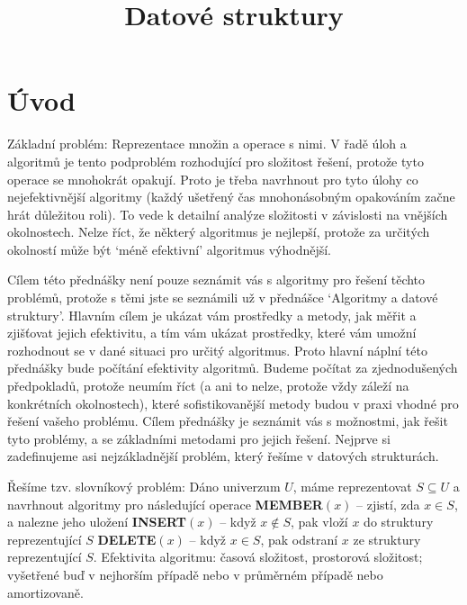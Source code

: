 \documentclass[a4paper,12pt]{article}
\begin{document}
     

\newtheorem*{dusledek}{Důsledek}
\newtheorem*{lemma}{Lemma}
\newtheorem*{veta}{Věta}
\newtheorem*{tvrzeni}{Tvrzení}

\def \emph#1{\underbar{#1}}
\def \Prob{\operatorname{Prob}}
\def \var{\operatorname{var}}

\title{Datové struktury}
\date{}
\maketitle

\section{Úvod}

Základní problém: Reprezentace množin a 
operace s nimi. V řadě úloh a algoritmů je tento 
podproblém rozhodující pro složitost řešení, protože 
tyto operace se mnohokrát opakují. Proto je třeba 
navrhnout pro tyto úlohy co nejefektivnější algoritmy 
(každý ušetřený čas mnohonásobným opakováním začne 
hrát důležitou roli). To vede k detailní 
analýze složitosti v závislosti na vnějších okolnostech. 
Nelze říct, 
že některý algoritmus je nejlepší, protože za určitých 
okolností může být `méně efektivní' algoritmus 
výhodnější.

Cílem této přednášky není pouze seznámit vás s algoritmy 
pro řešení těchto problémů, protože s těmi jste se 
seznámili už v přednášce `Algoritmy a datové struktury'. Hlavním cílem 
je ukázat vám prostředky a metody, jak měřit a zjišťovat 
jejich efektivitu, a tím vám ukázat prostřed\-ky, které vám 
umožní rozhodnout se v dané situaci pro určitý algoritmus. 
Proto hlavní náplní této přednášky bude počítání efektivity 
algoritmů. Budeme počítat za 
zjednoduše\-ných 
předpokladů, protože neumím říct (a ani to nelze, protože vždy záleží 
na konkrétních okolnostech), které sofistikovanější metody 
budou v praxi vhodné pro řešení vašeho problému. Cílem přednášky je 
seznámit vás s možnostmi, jak řešit tyto problémy, a se základními 
metodami pro jejich řešení. Nejprve si zadefinujeme asi 
nejzákladnější problém, který řešíme v datových strukturách. 

Řešíme tzv. slovníkový problém: Dáno 
univerzum $U$, máme reprezentovat $S\subseteq U$ a navrhnout algoritmy pro 
násle\-dující operace\newline 
{\bf MEMBER$(x)$} -- zjistí, zda $x\in S$, a nalezne jeho 
uložení\newline 
{\bf INSERT$(x)$} -- když $x\notin S$, pak vloží $x$ do struktury 
repre\-zentující $S$\newline 
{\bf DELETE$(x)$} -- když $x\in S$, pak odstraní $x$ ze struktury 
reprezentující $S$.\newline 
Efektivita algoritmu: časová složitost, prostorová 
složitost;\newline 
vy\-šetřené buď v nejhorším případě nebo v 
průměrném případě nebo amortizovaně.
\end{document}
